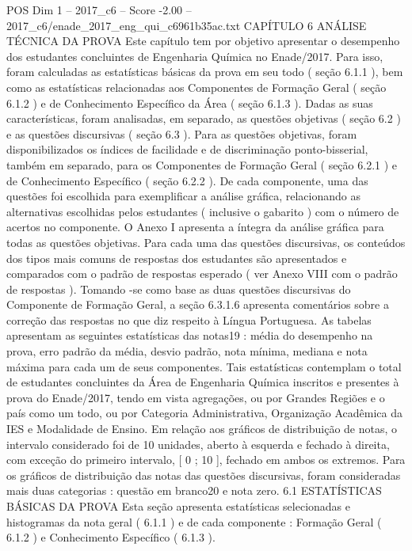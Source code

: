 \begin{textsample}{POS Dim 1 – 2017\_c6 – Score -2.00 – 2017\_c6/enade\_2017\_eng\_qui\_c6961b35ac.txt}  \label{ex:f1_pos_292}
CAPÍTULO 6 ANÁLISE TÉCNICA DA PROVA Este capítulo tem por objetivo apresentar o desempenho dos estudantes concluintes de Engenharia Química no Enade/2017.
Para isso, foram calculadas as estatísticas básicas da prova em seu todo ( seção 6.1.1 ), bem como as estatísticas relacionadas aos Componentes de Formação Geral ( seção 6.1.2 ) e de Conhecimento Específico da Área ( seção 6.1.3 ).
Dadas as suas características, foram analisadas, em separado, as questões objetivas ( seção 6.2 ) e as questões discursivas ( seção 6.3 ).
Para as questões objetivas, foram disponibilizados os índices de facilidade e de discriminação ponto-bisserial, também em separado, para os Componentes de Formação Geral ( seção 6.2.1 ) e de Conhecimento Específico ( seção 6.2.2 ).
De cada componente, uma das questões foi escolhida para exemplificar a análise gráfica, relacionando as alternativas escolhidas pelos estudantes ( inclusive o gabarito ) com o número de acertos no componente.
O Anexo I apresenta a íntegra da análise gráfica para todas as questões objetivas.
Para cada uma das questões discursivas, os conteúdos dos tipos mais comuns de respostas dos estudantes são apresentados e comparados com o padrão de respostas esperado ( ver Anexo VIII com o padrão de respostas ).
Tomando -se como base as duas questões discursivas do Componente de Formação Geral, a seção 6.3.1.6 apresenta comentários sobre a correção das respostas no que diz respeito à Língua Portuguesa.
As tabelas apresentam as seguintes estatísticas das notas19 : média do desempenho na prova, erro padrão da média, desvio padrão, nota mínima, mediana e nota máxima para cada um de seus componentes.
Tais estatísticas contemplam o total de estudantes concluintes da Área de Engenharia Química inscritos e presentes à prova do Enade/2017, tendo em vista agregações, ou por Grandes Regiões e o país como um todo, ou por Categoria Administrativa, Organização Acadêmica da IES e Modalidade de Ensino.
Em relação aos gráficos de distribuição de notas, o intervalo considerado foi de 10 unidades, aberto à esquerda e fechado à direita, com exceção do primeiro intervalo, [ 0 ; 10 ], fechado em ambos os extremos.
Para os gráficos de distribuição das notas das questões discursivas, foram consideradas mais duas categorias : questão em branco20 e nota zero. 6.1 ESTATÍSTICAS BÁSICAS DA PROVA Esta seção apresenta estatísticas selecionadas e histogramas da nota geral ( 6.1.1 ) e de cada componente : Formação Geral ( 6.1.2 ) e Conhecimento Específico ( 6.1.3 ).

\end{textsample}
